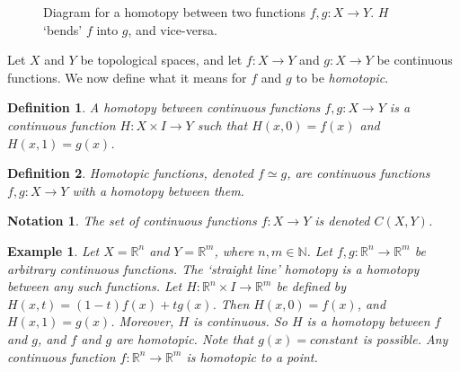 \documentclass{article}
\theoremstyle{mystyle}
\newtheorem{definition}{Definition}[section]
\newtheorem{example}{Example}[section]
\newtheorem{notation}{Notation}[section]
\begin{document}
\begin{wrapfigure}[8]{l}{0.35\textwidth}
    \caption[Surgery Theory - Homotopy Diagram]{Diagram for a homotopy between two functions $f,g:X\rightarrow Y$. $H$ `bends' $f$ into $g$, and vice-versa.}
    \label{fig:surgery_theory_course_homotopy_diagram_for_depicting_what_a_homotopy_is}
\end{wrapfigure}
Let $X$ and $Y$ be topological spaces, and let $f:X\rightarrow Y$ and $g:X\rightarrow Y$ be continuous functions. We now define what it means for $f$ and $g$ to be \textit{homotopic}.
\begin{definition}
A homotopy between continuous functions $f,g:X\rightarrow Y$ is a continuous function $H:X\times I \rightarrow Y$ such that $H(x,0)=f(x)$ and $H(x,1) = g(x)$.
\end{definition}
\begin{definition}
Homotopic functions, denoted $f\simeq g$, are continuous functions $f,g:X\rightarrow Y$ with a homotopy between them.
\end{definition}
\begin{notation}
The set of continuous functions $f:X\rightarrow Y$ is denoted $C(X,Y)$.
\end{notation}
\begin{example}
Let $X = \mathbb{R}^{n}$ and $Y = \mathbb{R}^{m}$, where $n,m\in \mathbb{N}$. Let $f,g:\mathbb{R}^{n}\rightarrow \mathbb{R}^{m}$ be arbitrary continuous functions. The `straight line' homotopy is a homotopy between any such functions. Let $H:\mathbb{R}^{n}\times I \rightarrow \mathbb{R}^{m}$ be defined by $H(x,t) = (1-t)f(x)+tg(x)$. Then $H(x,0) = f(x)$, and $H(x,1) = g(x)$. Moreover, $H$ is continuous. So $H$ is a homotopy between $f$ and $g$, and $f$ and $g$ are homotopic. Note that $g(x) = constant$ is possible. Any continuous function $f:\mathbb{R}^{n}\rightarrow\mathbb{R}^{m}$ is homotopic to a point.
\end{example}
\par
\end{document}
